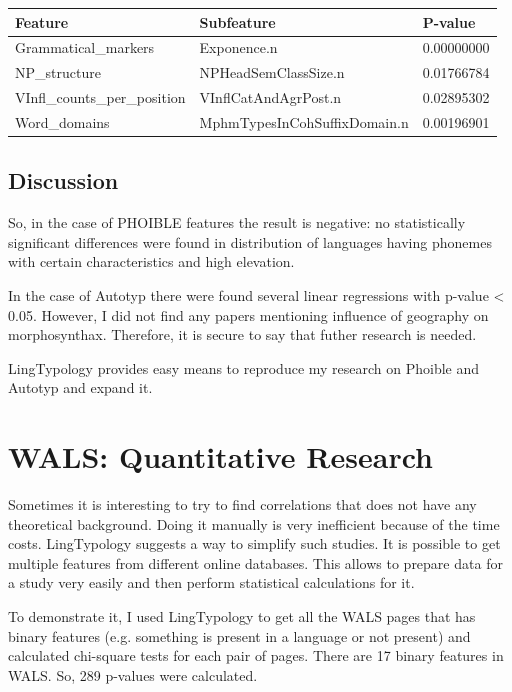 \documentclass[a4paper,12pt]{article}
\begin{document}
\noindent
\begin{minipage}{\textwidth}
\begin{tabular}{lll}
\toprule
Feature &                    Subfeature &     P-value \\
\midrule
Grammatical\_markers &                   Exponence.n &  0.00000000 \\
NP\_structure &          NPHeadSemClassSize.n &  0.01766784 \\
VInfl\_counts\_per\_position &          VInflCatAndAgrPost.n &  0.02895302 \\
Word\_domains &  MphmTypesInCohSuffixDomain.n &  0.00196901 \\
\bottomrule
\end{tabular}
\end{minipage}
\bigskip

\subsection{Discussion}

So, in the case of PHOIBLE features the result is negative: no statistically significant differences were found in distribution of languages having phonemes with certain characteristics and high elevation.

In the case of Autotyp there were found several linear regressions with p-value < 0.05. However, I did not find any papers mentioning influence of geography on morphosynthax. Therefore, it is secure to say that futher research is needed.

LingTypology provides easy means to reproduce my research on Phoible and Autotyp and expand it.
\newpage

\section{WALS: Quantitative Research}

Sometimes it is interesting to try to find correlations that does not have any theoretical background. Doing it manually is very inefficient because of the time costs. LingTypology suggests a way to simplify such studies. It is possible to get multiple features from different online databases. This allows to prepare data for a study very easily and then perform statistical calculations for it.

To demonstrate it, I used LingTypology to get all the WALS pages that has binary features (e.g. something is present in a language or not present) and calculated chi-square tests for each pair of pages. There are 17 binary features in WALS. So, 289 p-values were calculated.
\end{document}
